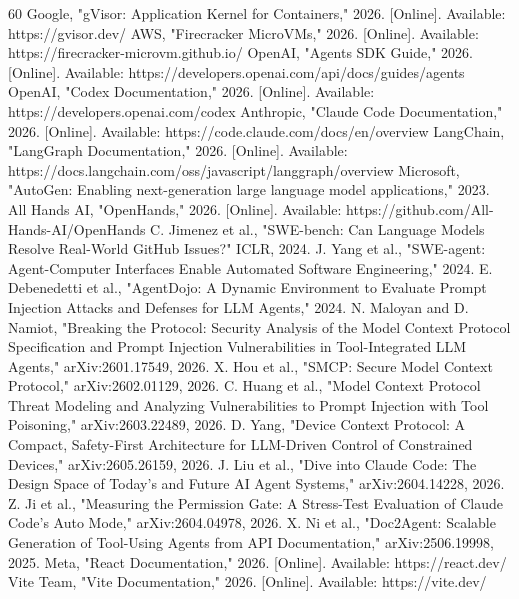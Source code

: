 \documentclass[10pt,journal,onecolumn]{IEEEtran}
\begin{document}
\begin{thebibliography}{60}
 Google, "gVisor: Application Kernel for Containers," 2026. [Online]. Available: https://gvisor.dev/
 AWS, "Firecracker MicroVMs," 2026. [Online]. Available: https://firecracker-microvm.github.io/
 OpenAI, "Agents SDK Guide," 2026. [Online]. Available: https://developers.openai.com/api/docs/guides/agents
 OpenAI, "Codex Documentation," 2026. [Online]. Available: https://developers.openai.com/codex
 Anthropic, "Claude Code Documentation," 2026. [Online]. Available: https://code.claude.com/docs/en/overview
 LangChain, "LangGraph Documentation," 2026. [Online]. Available: https://docs.langchain.com/oss/javascript/langgraph/overview
 Microsoft, "AutoGen: Enabling next-generation large language model applications," 2023.
 All Hands AI, "OpenHands," 2026. [Online]. Available: https://github.com/All-Hands-AI/OpenHands
 C. Jimenez et al., "SWE-bench: Can Language Models Resolve Real-World GitHub Issues?" ICLR, 2024.
 J. Yang et al., "SWE-agent: Agent-Computer Interfaces Enable Automated Software Engineering," 2024.
 E. Debenedetti et al., "AgentDojo: A Dynamic Environment to Evaluate Prompt Injection Attacks and Defenses for LLM Agents," 2024.
 N. Maloyan and D. Namiot, "Breaking the Protocol: Security Analysis of the Model Context Protocol Specification and Prompt Injection Vulnerabilities in Tool-Integrated LLM Agents," arXiv:2601.17549, 2026.
 X. Hou et al., "SMCP: Secure Model Context Protocol," arXiv:2602.01129, 2026.
 C. Huang et al., "Model Context Protocol Threat Modeling and Analyzing Vulnerabilities to Prompt Injection with Tool Poisoning," arXiv:2603.22489, 2026.
 D. Yang, "Device Context Protocol: A Compact, Safety-First Architecture for LLM-Driven Control of Constrained Devices," arXiv:2605.26159, 2026.
 J. Liu et al., "Dive into Claude Code: The Design Space of Today's and Future AI Agent Systems," arXiv:2604.14228, 2026.
 Z. Ji et al., "Measuring the Permission Gate: A Stress-Test Evaluation of Claude Code's Auto Mode," arXiv:2604.04978, 2026.
 X. Ni et al., "Doc2Agent: Scalable Generation of Tool-Using Agents from API Documentation," arXiv:2506.19998, 2025.
 Meta, "React Documentation," 2026. [Online]. Available: https://react.dev/
 Vite Team, "Vite Documentation," 2026. [Online]. Available: https://vite.dev/

\end{thebibliography}
\end{document}
